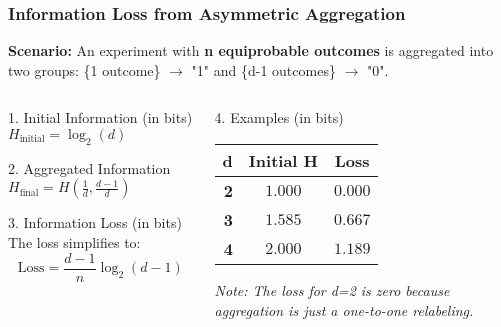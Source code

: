 \documentclass{beamer}
\begin{document}
\begin{frame}
\frametitle{Information Loss from Asymmetric Aggregation}
\small %

\textbf{Scenario:} An experiment with \textbf{n equiprobable outcomes} is aggregated into two groups: \{1 outcome\} $\to$ "1" and \{d-1 outcomes\} $\to$ "0".

\vspace{1em}

\begin{columns}[T]
    \begin{column}{0.5\textwidth}
        \begin{block}{1. Initial Information (in bits)}
            $H_{\text{initial}} = \log_2(d)$
        \end{block}

        \begin{block}{2. Aggregated Information}
            $H_{\text{final}} = H\left(\frac{1}{d}, \frac{d-1}{d}\right)$
        \end{block}

        \begin{block}{3. Information Loss (in bits)}
            The loss simplifies to:
            \begin{equation*}
                \text{Loss} = \frac{d-1}{n} \log_2(d-1)
            \end{equation*}
        \end{block}
    \end{column}

    \begin{column}{0.5\textwidth}
        \begin{block}{4. Examples (in bits)}
            \centering
            \begin{tabular}{r|cc}
                \textbf{d} & \textbf{Initial H} & \textbf{Loss} \\
                \hline
                \rule{0pt}{1.1em}%
                \textbf{2} & $1.000$ & $\mathbf{0.000}$ \\
                \rule{0pt}{1.1em}%
                \textbf{3} & $1.585$ & $\mathbf{0.667}$ \\
                \rule{0pt}{1.1em}%
                \textbf{4} & $2.000$ & $\mathbf{1.189}$ \\
            \end{tabular}
            \vspace{0.5em}

            \textit{Note: The loss for d=2 is zero because aggregation is just a one-to-one relabeling.}
        \end{block}
    \end{column}
\end{columns}

\end{frame}
\end{document}
